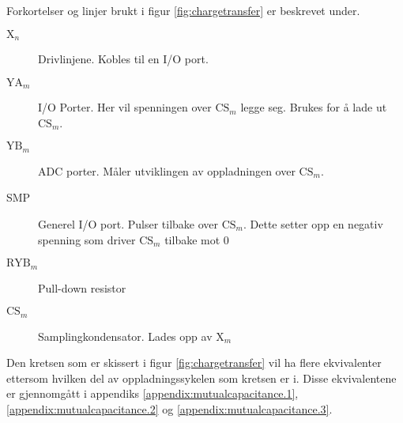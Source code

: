 \pagebreak
Forkortelser og linjer brukt i figur \vref{fig:chargetransfer} er beskrevet under.

\begin{description}
	\item[$\text{X}_n$] Drivlinjene. Kobles til en I/O port.
	\item[$\text{YA}_m$] I/O Porter. Her vil spenningen over $\text{CS}_m$ legge seg. Brukes for å lade ut $\text{CS}_m$.
	\item[$\text{YB}_m$] ADC porter. Måler utviklingen av oppladningen over $\text{CS}_m$.
	\item[SMP] Generel I/O port. Pulser tilbake over $\text{CS}_m$. Dette setter opp en negativ spenning som driver $\text{CS}_m$ tilbake mot 0
	\item[$\text{RYB}_m$] Pull-down resistor 
	\item[$\text{CS}_m$] Samplingkondensator. Lades opp av $\text{X}_m$
\end{description}

Den kretsen som er skissert i figur \vref{fig:chargetransfer} vil ha flere ekvivalenter ettersom hvilken del av oppladningssykelen som kretsen
er i. Disse ekvivalentene er gjennomgått i appendiks \vref{appendix:mutualcapacitance.1}, \vref{appendix:mutualcapacitance.2} og \vref{appendix:mutualcapacitance.3}.

\vfill

\pagebreak
